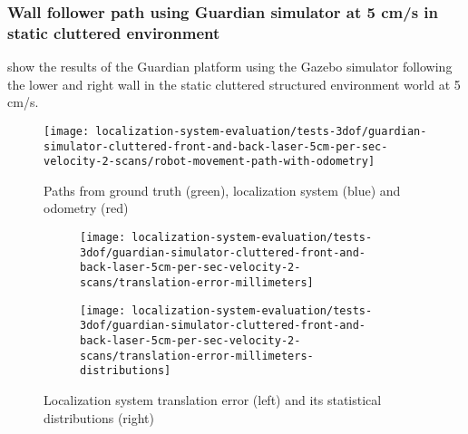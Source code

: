 \subsubsection{Wall follower path using Guardian simulator at 5 cm/s in static cluttered environment}

 show the results of the Guardian platform using the Gazebo simulator following the lower and right wall in the static cluttered structured environment world at 5 cm/s.

\begin{figure}[H]
	\centering
	\texttt{[image: localization-system-evaluation/tests-3dof/guardian-simulator-cluttered-front-and-back-laser-5cm-per-sec-velocity-2-scans/robot-movement-path-with-odometry]}
	\caption{Paths from ground truth (green), localization system (blue) and odometry (red)}
	\label{fig:localization-system-evaluation_guardian-simulator-cluttered-front-and-back-laser-5cm-per-sec-velocity-2-scans}
\end{figure}

\begin{figure}[H]
	\centering
	\begin{subfigure}[h]{0.47\textwidth}
		\centering
		\texttt{[image: localization-system-evaluation/tests-3dof/guardian-simulator-cluttered-front-and-back-laser-5cm-per-sec-velocity-2-scans/translation-error-millimeters]}
	\end{subfigure}
	\begin{subfigure}[h]{0.47\textwidth}
		\centering
		\texttt{[image: localization-system-evaluation/tests-3dof/guardian-simulator-cluttered-front-and-back-laser-5cm-per-sec-velocity-2-scans/translation-error-millimeters-distributions]}
	\end{subfigure}
	\caption{Localization system translation error (left) and its statistical distributions (right)}
	\label{fig:localization-system-evaluation_guardian-simulator-cluttered-front-and-back-laser-5cm-per-sec-velocity-2-scans_translation-errors}
\end{figure}

